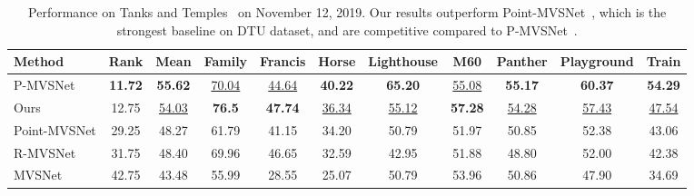 \begin{table*}[!t]
\begin{center}
\footnotesize
\begin{tabular}{l|cccccccccc}
\hline
Method       & Rank       & Mean  & Family & Francis & Horse & Lighthouse & M60   & Panther & Playground & Train \\
\hline\hline
P-MVSNet~\cite{luo2019p} & \textbf{11.72} & \textbf{55.62} & \underline{70.04} & \underline{44.64} & \textbf{40.22} & \textbf{65.20} & \underline{55.08} & \textbf{55.17} & \textbf{60.37} & \textbf{54.29} \\
Ours         & 12.75 & \underline{54.03} & \textbf{76.5}   & \textbf{47.74}   & \underline{36.34} & \underline{55.12}      & \textbf{57.28} & \underline{54.28}   & \underline{57.43}      & \underline{47.54} \\
Point-MVSNet\cite{chen2019point} & 29.25      & 48.27 & 61.79  & 41.15   & 34.20  & 50.79      & 51.97 & 50.85   & 52.38      & 43.06 \\
R-MVSNet\cite{yao2019recurrent}     & 31.75      & 48.40  & 69.96  & 46.65   & 32.59 & 42.95      & 51.88 & 48.80    & 52.00         & 42.38 \\
MVSNet\cite{yao2018mvsnet}       & 42.75      & 43.48 & 55.99  & 28.55   & 25.07 & 50.79      & 53.96 & 50.86   & 47.90       & 34.69 \\
\hline
\end{tabular}
\end{center}
\vspace{-0.4cm}
\caption{Performance on Tanks and Temples~\cite{knapitsch2017tanks} on November 12, 2019. Our results outperform Point-MVSNet~\cite{chen2019point}, which is the strongest baseline on DTU dataset, and are competitive compared to P-MVSNet~\cite{luo2019p}.}
\label{tanks}
\vspace{-0.4cm}
\end{table*}

